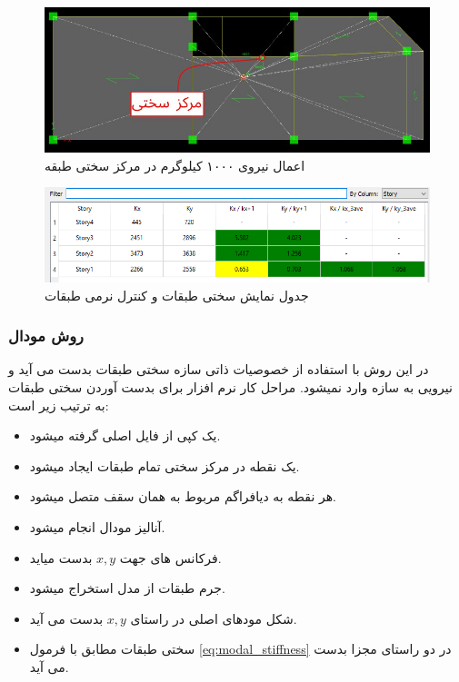 \begin{figure}[H]
    \centering
    \includegraphics[scale=0.7]{figures/stiffness_load_in_center_of_rigidity}
    \caption{اعمال نیروی ۱۰۰۰ کیلوگرم در مرکز سختی طبقه}
    \label{pic:stiffness_load}
\end{figure}

\begin{figure}[H]
    \centering
    \includegraphics[scale=0.7]{figures/stiffness_2800}
    \caption{جدول نمایش سختی طبقات و کنترل نرمی طبقات}
    \label{pic:stiffness_2800}
\end{figure}

\subsubsection{روش مودال}
در این روش با استفاده از خصوصیات ذاتی سازه سختی طبقات بدست می آید و نیرویی به سازه وارد نمیشود. 
مراحل کار نرم افزار برای بدست آوردن سختی طبقات به ترتیب زیر است:
\begin{itemize}
    \item یک کپی از فایل اصلی گرفته میشود.
    \item یک نقطه در مرکز سختی تمام طبقات ایجاد میشود.
    \item  هر نقطه به دیافراگم مربوط به همان سقف متصل میشود.
    \item  آنالیز مودال انجام میشود.
    \item  فرکانس های جهت $x, y$ بدست میاید.
    \item  جرم طبقات از مدل استخراج میشود.
    \item شکل مودهای اصلی در راستای $x, y$ بدست می آید.
    \item سختی طبقات مطابق با فرمول \ref{eq:modal_stiffness} در دو راستای مجزا بدست می آید.
\end{itemize}

